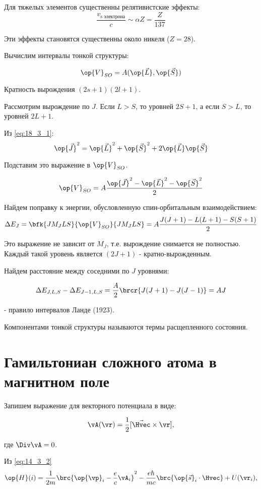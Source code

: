 Для тяжелых элементов существенны релятивистские эффекты:
$$
\frac{v_{\text{s электрона}}}{c} \sim \alpha Z = \frac{Z}{137}
$$

Эти эффекты становятся существенны около никеля ($Z = 28$).

Вычислим интервалы тонкой структуры:

$$
\op{V}_{SO} = A(\op{\vec{L}}, \op{\vec{S}})
$$

Кратность вырождения $(2s + 1)(2l+1)$. 

Рассмотрим вырождение по $J$. Если $L > S$, то уровней $2S+1$, а если $S> L$, то уровней $2L+1$.

Из \eqref{eq:18_3_1}:
$$
\op{\vec{J}}^2 = \op{\vec{L}}^2 + \op{\vec{S}}^2 + 2\op{\vec{L}}\op{\vec{S}}
$$

Подставим это выражение в $\op{V}_{SO}$.

\begin{equation}
\label{eq:18_4_2}
\op{V}_{SO} = A\frac{\op{\vec{J}}^2 - \op{\vec{L}}^2 - \op{\vec{S}}^2}{2}
\end{equation}

Найдем поправку к энергии, обусловленную спин-орбитальным взаимодействием:
$$
\Delta E_J = \bfk{J M_J L S}{\op{V}_{SO}}{J M_J L S} = A \frac{J(J+1) - L(L+1) - S(S+1)}{2}
$$

Это выражение не зависит от $M_J$, т.е. вырождение снимается не полностью. Каждый такой уровень является $(2J+1)$ - кратно-вырожденным.

Найдем расстояние между соседними по $J$ уровнями:

\begin{equation}
\label{eq:18_4_3}
\Delta E_{J,L,S} - \Delta E_{J-1, L, S} = \frac{A}{2}\brcr{J(J+1) - J(J-1)} = AJ
\end{equation}

- правило интервалов Ланде (1923).

Компонентами тонкой структуры называются термы расщепленного состояния.

\section{Гамильтониан сложного атома в магнитном поле}

Запишем выражение для векторного потенциала в виде:

$$
\vA(\vr) = \frac{1}{2}[\vec{\Hvec} \times \vr],
$$

где $\Div \vA = 0$.

Из \eqref{eq:14_3_2}
\begin{equation}
\label{eq:18_5_1}
\op{H}(i) = \frac{1}{2m}\brc{\op{\vp}_i - \frac{e}{c}\vA_i}^2 - \frac{e\hbar}{mc}\brc{\op{\vec{s}}_i \cdot \Hvec} + U(\vr_i),
\end{equation}

